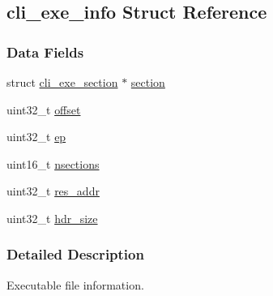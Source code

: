 \hypertarget{structcli__exe__info}{\subsection{cli\-\_\-exe\-\_\-info Struct Reference}
\label{structcli__exe__info}
}
\subsubsection*{Data Fields}
\begin{DoxyCompactItemize}
\item 
struct \hyperlink{structcli__exe__section}{cli\-\_\-exe\-\_\-section} $\ast$ \hyperlink{structcli__exe__info_a1c449c2a02971006b72d8ab755684716}{section}
\item 
uint32\-\_\-t \hyperlink{structcli__exe__info_a894bdfa2d603d8343f8ef01dda6fcd23}{offset}
\item 
uint32\-\_\-t \hyperlink{structcli__exe__info_afaed4671662028c061ab84eefcce0546}{ep}
\item 
uint16\-\_\-t \hyperlink{structcli__exe__info_aa4af5e526457df524fc9a4ba46803a70}{nsections}
\item 
uint32\-\_\-t \hyperlink{structcli__exe__info_ac0f1b36bb8a1eeb981958dc4643f67dd}{res\-\_\-addr}
\item 
uint32\-\_\-t \hyperlink{structcli__exe__info_af2492dd421362ffced98eb583964b310}{hdr\-\_\-size}
\end{DoxyCompactItemize}


\subsubsection{Detailed Description}
Executable file information. 

